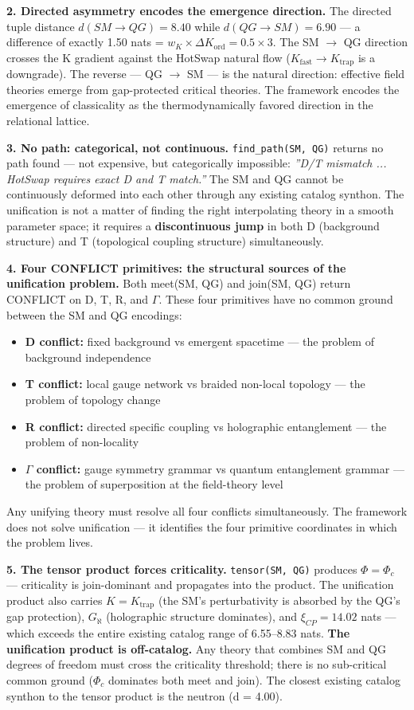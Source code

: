 \documentclass[12pt,a4paper]{article}
\begin{document}
\textbf{2. Directed asymmetry encodes the emergence direction.} The directed tuple distance $d(SM \to QG) = 8.40$ while $d(QG \to SM) = 6.90$ --- a difference of exactly 1.50 nats = $w_K \times \Delta K_\text{ord} = 0.5 \times 3$. The SM $\to$ QG direction crosses the K gradient against the HotSwap natural flow ($K_\text{fast} \to K_\text{trap}$ is a downgrade). The reverse --- QG $\to$ SM --- is the natural direction: effective field theories emerge from gap-protected critical theories. The framework encodes the emergence of classicality as the thermodynamically favored direction in the relational lattice.

\textbf{3. No path: categorical, not continuous.} \texttt{find\_path(SM, QG)} returns no path found --- not expensive, but categorically impossible: \emph{''D/T mismatch ... HotSwap requires exact D and T match.''} The SM and QG cannot be continuously deformed into each other through any existing catalog synthon. The unification is not a matter of finding the right interpolating theory in a smooth parameter space; it requires a \textbf{discontinuous jump} in both D (background structure) and T (topological coupling structure) simultaneously.

\textbf{4. Four CONFLICT primitives: the structural sources of the unification problem.} Both meet(SM, QG) and join(SM, QG) return CONFLICT on D, T, R, and $\Gamma$. These four primitives have no common ground between the SM and QG encodings:

\begin{itemize}
    \item \textbf{D conflict:} fixed background vs emergent spacetime --- the problem of background independence
    \item \textbf{T conflict:} local gauge network vs braided non-local topology --- the problem of topology change
    \item \textbf{R conflict:} directed specific coupling vs holographic entanglement --- the problem of non-locality
    \item \textbf{$\Gamma$ conflict:} gauge symmetry grammar vs quantum entanglement grammar --- the problem of superposition at the field-theory level
\end{itemize}

Any unifying theory must resolve all four conflicts simultaneously. The framework does not solve unification --- it identifies the four primitive coordinates in which the problem lives.

\textbf{5. The tensor product forces criticality.} \texttt{tensor(SM, QG)} produces $\Phi = \Phi_c$ --- criticality is join-dominant and propagates into the product. The unification product also carries $K = K_\text{trap}$ (the SM's perturbativity is absorbed by the QG's gap protection), $G_{\aleph}$ (holographic structure dominates), and $\xi_{CP} = 14.02$ nats --- which exceeds the entire existing catalog range of 6.55--8.83 nats. \textbf{The unification product is off-catalog.} Any theory that combines SM and QG degrees of freedom must cross the criticality threshold; there is no sub-critical common ground ($\Phi_c$ dominates both meet and join). The closest existing catalog synthon to the tensor product is the neutron (d = 4.00).
\end{document}
